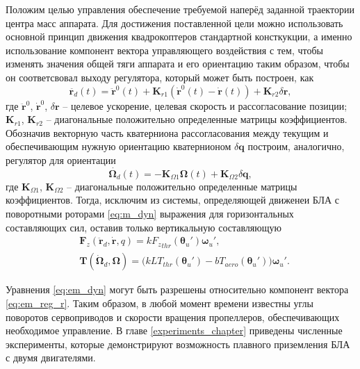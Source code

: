 Положим целью управления обеспечение требуемой наперёд заданной траектории центра масс аппарата.
Для достижения поставленной цели можно использовать основной принцип движения квадрокоптеров стандартной консткукции, а именно использование компонент вектора управляющего воздействия с тем, чтобы изменять значения общей тяги аппарата и его ориентацию таким образом, чтобы он соответсвовал выходу регулятора, который может быть построен, как
\begin{equation} \label{eq:em_reg_r}
\ddot{\bm{r}_d}(t)=
\ddot{\bm{r}}^0(t)+\bm{K}_{r1}(\dot{\bm{r}}^0(t)-\dot{\bm{r}}(t))+\bm{K}_{r2}\delta \bm r,
\end{equation}
где 
$\ddot{\bm{r}}^0$, $\dot{\bm{r}}^0$, $\delta \bm r$ -- целевое ускорение, целевая скорость и рассогласование позиции;
$\bm K_{r1}$, $\bm K_{r2}$ 
-- диагональные положительно определенные матрицы коэффициентов.
Обозначив векторную часть кватерниона рассогласования между текущим и обеспечивающим нужную ориентацию кватернионом
$\delta \bm q$
построим, аналогично, регулятор для ориентации
\begin{equation} \label{eq:em_reg_q}
\dot{\bm{\Omega}_d}(t)=
-\bm{K}_{\Omega1}\bm{\Omega}(t)+\bm{K}_{\Omega2}\delta\bm{q},
\end{equation}
где $\bm K_{\Omega1}$, $\bm K_{\Omega2}$ 
-- диагональные положительно определенные матрицы коэффициентов.
Тогда, исключим из системы, определяющей движенеи БЛА с поворотными роторами \eqref{eq:m_dyn} выражения для горизонтальных составляющих сил, оставив только вертикальную составляющую
\begin{equation} \label{eq:em_dyn}
\begin{aligned}
&\bm F_z(\ddot{\bm r}_d, \dot{\bm r}, q) = k {F_z}_{thr} (\bm \theta_u') \bm \omega_u',\\
&\bm T(\dot{\bm \Omega}_d, \bm\Omega) = \Big(
kLT_{thr}(\bm\theta_u') - bT_{aero}(\bm\theta_u')
\Big)
\bm \omega_u'.
\end{aligned}
\end{equation}

Уравнения \eqref{eq:em_dyn} могут быть разрешены относительно компонент вектора \eqref{eq:em_reg_r}. Таким образом, в любой момент времени известны углы поворотов сервоприводов и скорости вращения пропеллеров, обеспечивающих необходимое управление.
В главе \ref{experiments_chapter} приведены численные эксперименты, которые демонстрируют возможность плавного приземления БЛА с двумя двигателями.

